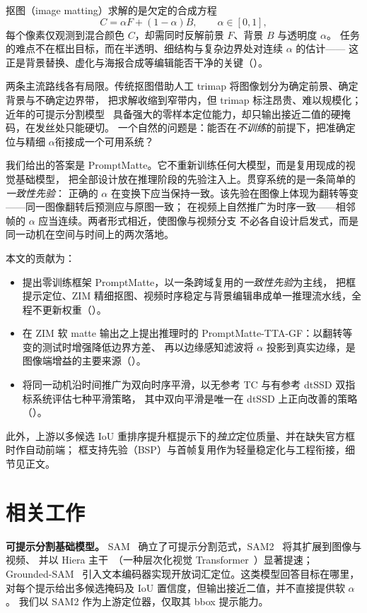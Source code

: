 \documentclass[final]{cvpr}
\begin{document}
抠图（image matting）求解的是欠定的合成方程
\begin{equation}
C=\alpha F+(1-\alpha)B,\qquad \alpha\in[0,1],
\label{eq:matting}
\end{equation}
每个像素仅观测到混合颜色 $C$，却需同时反解前景 $F$、背景 $B$ 与透明度 $\alpha$。
任务的难点不在框出目标，而在半透明、细结构与复杂边界处对连续 $\alpha$ 的估计——
这正是背景替换、虚化与海报合成等编辑能否干净的关键（）。

两条主流路线各有局限。传统抠图借助人工 trimap 将图像划分为确定前景、确定背景与不确定边界带，
把求解收缩到窄带内，但 trimap 标注昂贵、难以规模化；近年的可提示分割模型~\cite{sam,sam2}
具备强大的零样本定位能力，却只输出接近二值的硬掩码，在发丝处只能硬切。
一个自然的问题是：能否在\emph{不训练}的前提下，把准确定位与精细 $\alpha$衔接成一个可用系统？

我们给出的答案是 PromptMatte。它不重新训练任何大模型，而是复用现成的视觉基础模型，
把全部设计放在推理阶段的先验注入上。贯穿系统的是一条简单的\emph{一致性先验}：
正确的 $\alpha$ 在变换下应当保持一致。该先验在图像上体现为翻转等变——同一图像翻转后预测应与原图一致；
在视频上自然推广为时序一致——相邻帧的 $\alpha$ 应当连续。两者形式相近，使图像与视频分支
不必各自设计启发式，而是同一动机在空间与时间上的两次落地。

本文的贡献为：
\begin{itemize}
\item 提出零训练框架 PromptMatte，以一条跨域复用的\emph{一致性先验}为主线，
把框提示定位、ZIM 精细抠图、视频时序稳定与背景编辑串成单一推理流水线，全程不更新权重（）。
\item 在 ZIM 软 matte 输出之上提出推理时的 PromptMatte-TTA-GF：以翻转等变的测试时增强降低边界方差、
再以边缘感知滤波将 $\alpha$ 投影到真实边缘，是图像端增益的主要来源（）。
\item 将同一动机沿时间推广为双向时序平滑，以无参考 TC 与有参考 dtSSD 双指标系统评估七种平滑策略，
其中双向平滑是唯一在 dtSSD 上正向改善的策略（）。
\end{itemize}
此外，上游以多候选 IoU 重排序提升框提示下的\emph{独立}定位质量、并在缺失官方框时作自动前端；
框支持先验（BSP）与首帧复用作为轻量稳定化与工程衔接，细节见正文。

\section{相关工作}
\label{sec:related}

\noindent\textbf{可提示分割基础模型。}
SAM~\cite{sam} 确立了可提示分割范式，SAM2~\cite{sam2} 将其扩展到图像与视频、
并以 Hiera 主干~\cite{hiera}（一种层次化视觉 Transformer~\cite{vit}）显著提速；
Grounded-SAM~\cite{groundedsam} 引入文本编码器实现开放词汇定位。这类模型回答目标在哪里，
对每个提示给出多候选掩码及 IoU 置信度，但输出接近二值，并不直接提供软 $\alpha$。
我们以 SAM2 作为上游定位器，仅取其 bbox 提示能力。
\end{document}
